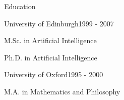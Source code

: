 \documentclass{resume} %
\begin{document}

\begin{rSection}{Education}
\begin{rSubsection}{University of Edinburgh}{1999 - 2007}{}{}
\item M.Sc. in Artificial Intelligence
\item Ph.D. in Artificial Intelligence
\end{rSubsection}

\begin{rSubsection}{University of Oxford}{1995 - 2000}{}{}
\item M.A. in Mathematics and Philosophy
\end{rSubsection}
\end{rSection}

\end{document}

